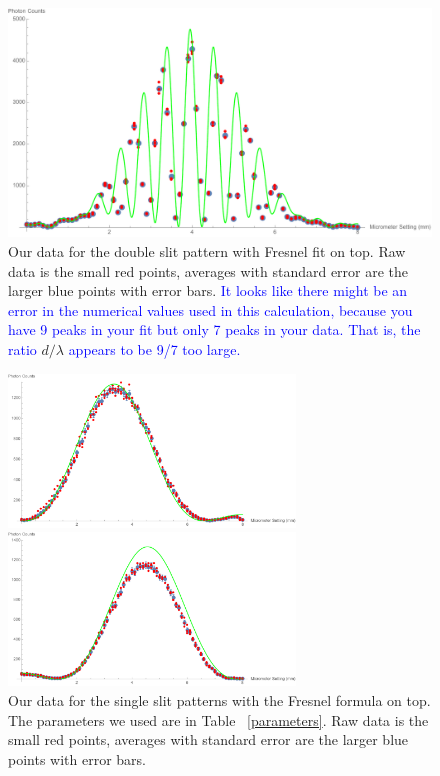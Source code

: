 \documentclass[prb,preprint]{revtex4-1}
\begin{document}
\begin{figure}[h!]
\centering
\includegraphics[width=6in]{double_slit_Fresnel_plot.pdf}
\caption{Our data for the double slit pattern with Fresnel fit on top.  Raw data is the small red points, averages with standard error are the larger blue points with error bars. \textcolor{blue}{It looks like there might be an error in the numerical values used in this calculation, because you have 9 peaks in your fit but only 7 peaks in your data. That is, the ratio }$d/{\lambda}$ \textcolor{blue}{appears to be 9/7 too large.}}
\label{double_slit_Fresnel_plot}
\end{figure}

\begin{figure}[h!]
\centering
\begin{minipage}[b]{0.45\linewidth}
	\includegraphics[width=3in]{far_slit_Fresnel_plot.pdf}
\end{minipage}
\quad
\begin{minipage}[b]{0.45\linewidth}
	\includegraphics[width=3in]{near_slit_Fresnel_plot.pdf}
\end{minipage}
\caption{Our data for the single slit patterns with the Fresnel formula on top. The parameters we used are in Table ~\ref{parameters}. Raw data is the small red points, averages with standard error are the larger blue points with error bars. }
\label{single_slits_Fresnel_plot}
\end{figure} 
\end{document}
